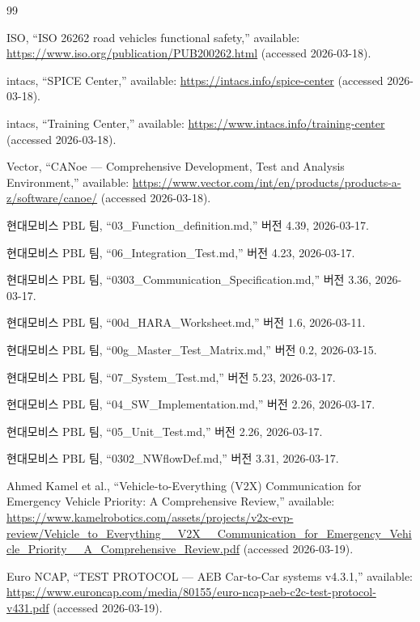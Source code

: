 \documentclass[11pt,a4paper]{article}
\begin{document}
\begin{thebibliography}{99}

ISO, ``ISO 26262 road vehicles functional safety,'' available: \url{https://www.iso.org/publication/PUB200262.html} (accessed 2026-03-18).

intacs, ``SPICE Center,'' available: \url{https://intacs.info/spice-center} (accessed 2026-03-18).

intacs, ``Training Center,'' available: \url{https://www.intacs.info/training-center} (accessed 2026-03-18).

Vector, ``CANoe --- Comprehensive Development, Test and Analysis Environment,'' available: \url{https://www.vector.com/int/en/products/products-a-z/software/canoe/} (accessed 2026-03-18).

현대모비스 PBL 팀, ``03\_Function\_definition.md,'' 버전 4.39, 2026-03-17.

현대모비스 PBL 팀, ``06\_Integration\_Test.md,'' 버전 4.23, 2026-03-17.

현대모비스 PBL 팀, ``0303\_Communication\_Specification.md,'' 버전 3.36, 2026-03-17.

현대모비스 PBL 팀, ``00d\_HARA\_Worksheet.md,'' 버전 1.6, 2026-03-11.

현대모비스 PBL 팀, ``00g\_Master\_Test\_Matrix.md,'' 버전 0.2, 2026-03-15.

현대모비스 PBL 팀, ``07\_System\_Test.md,'' 버전 5.23, 2026-03-17.

현대모비스 PBL 팀, ``04\_SW\_Implementation.md,'' 버전 2.26, 2026-03-17.

현대모비스 PBL 팀, ``05\_Unit\_Test.md,'' 버전 2.26, 2026-03-17.

현대모비스 PBL 팀, ``0302\_NWflowDef.md,'' 버전 3.31, 2026-03-17.

Ahmed Kamel et al., ``Vehicle-to-Everything (V2X) Communication for Emergency Vehicle Priority: A Comprehensive Review,'' available: \url{https://www.kamelrobotics.com/assets/projects/v2x-evp-review/Vehicle_to_Everything__V2X__Communication_for_Emergency_Vehicle_Priority__A_Comprehensive_Review.pdf} (accessed 2026-03-19).

Euro NCAP, ``TEST PROTOCOL --- AEB Car-to-Car systems v4.3.1,'' available: \url{https://www.euroncap.com/media/80155/euro-ncap-aeb-c2c-test-protocol-v431.pdf} (accessed 2026-03-19).


\end{thebibliography}
\end{document}
